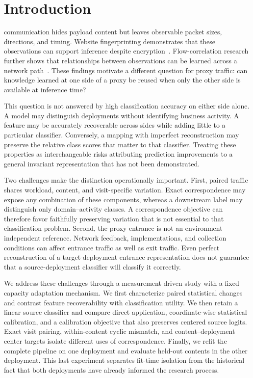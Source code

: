 \section{Introduction}
 communication hides payload content but leaves observable packet sizes, directions, and timing. Website fingerprinting demonstrates that these observations can support inference despite encryption~\cite{df,automated}. Flow-correlation research further shows that relationships between observations can be learned across a network path~\cite{deepcorr}. These findings motivate a different question for proxy traffic: can knowledge learned at one side of a proxy be reused when only the other side is available at inference time?

This question is not answered by high classification accuracy on either side alone. A model may distinguish deployments without identifying business activity. A feature may be accurately recoverable across sides while adding little to a particular classifier. Conversely, a mapping with imperfect reconstruction may preserve the relative class scores that matter to that classifier. Treating these properties as interchangeable risks attributing prediction improvements to a general invariant representation that has not been demonstrated.

Two challenges make the distinction operationally important. First, paired traffic shares workload, content, and visit-specific variation. Exact correspondence may expose any combination of these components, whereas a downstream label may distinguish only domain--activity classes. A correspondence objective can therefore favor faithfully preserving variation that is not essential to that classification problem. Second, the proxy entrance is not an environment-independent reference. Network feedback, implementations, and collection conditions can affect entrance traffic as well as exit traffic. Even perfect reconstruction of a target-deployment entrance representation does not guarantee that a source-deployment classifier will classify it correctly.

We address these challenges through a measurement-driven study with a fixed-capacity adaptation mechanism. We first characterize paired statistical changes and contrast feature recoverability with classification utility. We then retain a linear source classifier and compare direct application, coordinate-wise statistical calibration, and a calibration objective that also preserves centered source logits. Exact visit pairing, within-content cyclic mismatch, and content--deployment center targets isolate different uses of correspondence. Finally, we refit the complete pipeline on one deployment and evaluate held-out contents in the other deployment. This last experiment separates fit-time isolation from the historical fact that both deployments have already informed the research process.

